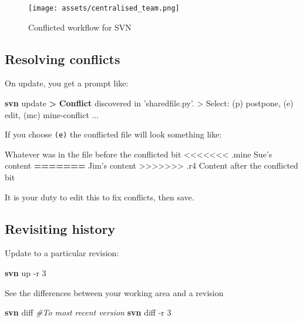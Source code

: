 \documentclass[]{scrartcl}
\makeatletter
\newenvironment{Shaded}{}{}
\newcommand{\KeywordTok}[1]{\textcolor[rgb]{0.00,0.44,0.13}{\textbf{{#1}}}}
\newcommand{\StringTok}[1]{\textcolor[rgb]{0.25,0.44,0.63}{{#1}}}
\newcommand{\CommentTok}[1]{\textcolor[rgb]{0.38,0.63,0.69}{\textit{{#1}}}}
\newcommand{\OtherTok}[1]{\textcolor[rgb]{0.00,0.44,0.13}{{#1}}}
\newcommand{\NormalTok}[1]{{#1}}
\def\maxwidth{\ifdim\Gin@nat@width>\linewidth\linewidth
\else\Gin@nat@width\fi}
\let\Oldincludegraphics\includegraphics
\renewcommand{\includegraphics}[1]{\Oldincludegraphics[width=\maxwidth]{#1}}
\makeatother
\begin{document}
\begin{figure}[htbp]
\centering
\texttt{[image: assets/centralised\_team.png]}
\caption{Conflicted workflow for SVN}
\end{figure}

\subsection{Resolving conflicts}\label{resolving-conflicts}

On update, you get a prompt like:

\begin{Shaded}
\begin{Highlighting}[]
\KeywordTok{svn} \NormalTok{update}
\KeywordTok{>} \KeywordTok{Conflict} \NormalTok{discovered in ’sharedfile.py}\StringTok{'. }
\StringTok{> Select: (p) postpone, (e) edit, (mc) mine-conflict ...}
\end{Highlighting}
\end{Shaded}

If you choose \texttt{(e)} the conflicted file will look something like:

\begin{Shaded}
\begin{Highlighting}[]
\NormalTok{Whatever was in the file before the conflicted bit}
\StringTok{<<<<<<< .mine}
\NormalTok{Sue’s content}
\KeywordTok{======= }
\NormalTok{Jim’s content}
\OtherTok{>>>>>>> .r4}
\NormalTok{Content after the conflicted bit}
\end{Highlighting}
\end{Shaded}

It is your duty to edit this to fix conflicts, then save.

\subsection{Revisiting history}\label{revisiting-history}

Update to a particular revision:

\begin{Shaded}
\begin{Highlighting}[]
\KeywordTok{svn} \NormalTok{up -r 3}
\end{Highlighting}
\end{Shaded}

See the differences between your working area and a revision

\begin{Shaded}
\begin{Highlighting}[]
\KeywordTok{svn} \NormalTok{diff }\CommentTok{#To most recent version}
\KeywordTok{svn} \NormalTok{diff -r 3}
\end{Highlighting}
\end{Shaded}
\end{document}
